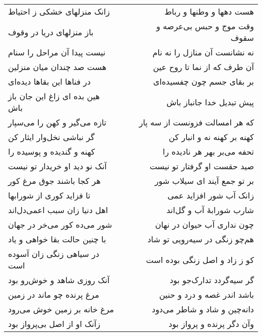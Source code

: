 \begin{center}
\begin{longtable}{l p{0.5cm} r}
\\
زانک منزلهای خشکی ز احتیاط
&&
هست دهها و وطنها و رباط
\\
باز منزلهای دریا در وقوف
&&
وقت موج و حبس بی‌عرصه و سقوف
\\
نیست پیدا آن مراحل را سنام
&&
نه نشانست آن منازل را نه نام
\\
هست صد چندان میان منزلین
&&
آن طرف که از نما تا روح عین
\\
در فناها این بقاها دیده‌ای
&&
بر بقای جسم چون چفسیده‌ای
\\
هین بده ای زاغ این جان باز باش
&&
پیش تبدیل خدا جانباز باش
\\
تازه می‌گیر و کهن را می‌سپار
&&
که هر امسالت فزونست از سه پار
\\
گر نباشی نخل‌وار ایثار کن
&&
کهنه بر کهنه نه و انبار کن
\\
کهنه و گندیده و پوسیده را
&&
تحفه می‌بر بهر هر نادیده را
\\
آنک نو دید او خریدار تو نیست
&&
صید حقست او گرفتار تو نیست
\\
هر کجا باشند جوق مرغ کور
&&
بر تو جمع آیند ای سیلاب شور
\\
تا فزاید کوری از شورابها
&&
زانک آب شور افزاید عمی
\\
اهل دنیا زان سبب اعمی‌دل‌اند
&&
شارب شورابهٔ آب و گل‌اند
\\
شور می‌ده کور می‌خر در جهان
&&
چون نداری آب حیوان در نهان
\\
با چنین حالت بقا خواهی و یاد
&&
هم‌چو زنگی در سیه‌رویی تو شاد
\\
در سیاهی زنگی زان آسوده است
&&
کو ز زاد و اصل زنگی بوده است
\\
آنک روزی شاهد و خوش‌رو بود
&&
گر سیه‌گردد تدارک‌جو بود
\\
مرغ پرنده چو ماند در زمین
&&
باشد اندر غصه و درد و حنین
\\
مرغ خانه بر زمین خوش می‌رود
&&
دانه‌چین و شاد و شاطر می‌دود
\\
زآنک او از اصل بی‌پرواز بود
&&
وآن دگر پرنده و پرواز بود
\\
\end{longtable}
\end{center}

